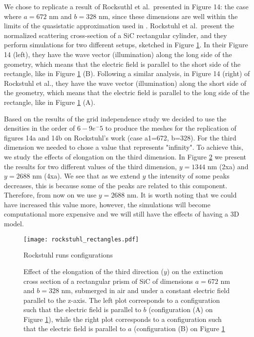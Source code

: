We chose to replicate a result of Rocksuthl et al.\ presented in Figure 14: 
the case where $a=672$ nm 
and $b=328$ nm, since these dimensions are well within the limits of the quasistatic approximation 
used in \pygbe. Rockstuhl et al.\ present the normalized scattering cross-section of a SiC rectangular 
cylinder, and they perform simulations for two different setups, sketched in Figure \ref{fig:rectangle_sketch}. In 
their Figure 14 (left), they have the wave vector (illumination) along the long 
side of the geometry, which means that the electric field is parallel to the short side of the rectangle, like in 
Figure \ref{fig:rectangle_sketch} (B). Following a similar analysis, in Figure 14 (right) of Rockstuhl et al., they have the wave 
vector (illumination) along the short side of the geometry, which means that the electric field is parallel to the 
long side of the rectangle, like in Figure \ref{fig:rectangle_sketch} (A). 

Based on the results of the grid independence study we decided to use the densities in the order of $6-9e^-5$
to produce the meshes for the replication of figures 14a and 14b on Rockstuhl's work (case a1=672, b=328). For the third 
dimension we needed to chose a value that represents "infinity". To achieve this, we study the effects of 
elongation on the third dimension. In Figure \ref{fig:ext_y_14} we present the results for two different
values of the third dimension, $y=1344$ nm (2xa) and $y=2688$ nm (4xa). We see that as we extend $y$ the 
intensity of some peaks decreases, this is because some of the peaks are related to this component. Therefore, 
from now on we use $y=2688$ nm. It is worth noting that we could have increased this value more, however, the
simulations will become computational more expensive and we will still have the effects of having a 3D model.

\begin{figure}
    \centering
    \texttt{[image: rockstuhl\_rectangles.pdf]} 
    \caption{Rockstuhl runs configurations}
    \label{fig:rectangle_sketch}
\end{figure}

\begin{figure}
    \centering
    \caption{Effect of the elongation of the third direction ($y$) on the 
        extinction cross section of a rectangular prism of SiC of dimensions $a=672$ nm 
        and $b=328$ nm, submerged in air and under a constant electric field 
        parallel to the z-axis. The left plot corresponds to a configuration such that the electric 
        field is parallel to $b$ (configuration (A) on Figure \ref{fig:rectangle_sketch}), while the 
        right plot corresponds to a configuration such that the electric field is 
        parallel to $a$ (configuration (B) on Figure \ref{fig:rectangle_sketch}}
    \label{fig:ext_y_14}   
 \end{figure}


